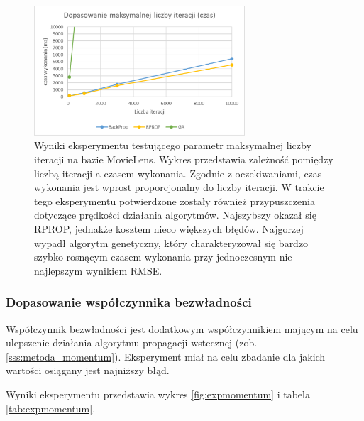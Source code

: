 \documentclass[twoside]{iisthesis}
\begin{document}
				\begin{figure}[!ht]
					\centering
					\includegraphics[width=0.7\textwidth]{expiterations_time}			
					\caption{Wyniki eksperymentu testującego parametr maksymalnej liczby iteracji na bazie MovieLens. Wykres przedstawia zależność pomiędzy liczbą iteracji a czasem wykonania. Zgodnie z oczekiwaniami, czas wykonania jest wprost proporcjonalny do liczby iteracji. W trakcie tego eksperymentu potwierdzone zostały również przypuszczenia dotyczące prędkości działania algorytmów. Najszybszy okazał się RPROP, jednakże kosztem nieco większych błędów. Najgorzej wypadł algorytm genetyczny, który charakteryzował się bardzo szybko rosnącym czasem wykonania przy jednoczesnym nie najlepszym wynikiem RMSE. }
					\label{fig:expiterations_time}
				\end{figure}
					
			\subsubsection{Dopasowanie współczynnika bezwładności} 
			\label{exp:momentum}
				
			Współczynnik bezwładności jest dodatkowym współczynnikiem mającym na celu ulepszenie działania algorytmu propagacji wstecznej (zob. \ref{sss:metoda_momentum}). Eksperyment miał na celu zbadanie dla jakich wartości osiągany jest najniższy błąd.
			
			Wyniki eksperymentu przedstawia wykres \ref{fig:expmomentum} i tabela \ref{tab:expmomentum}. 
				
\end{document}
